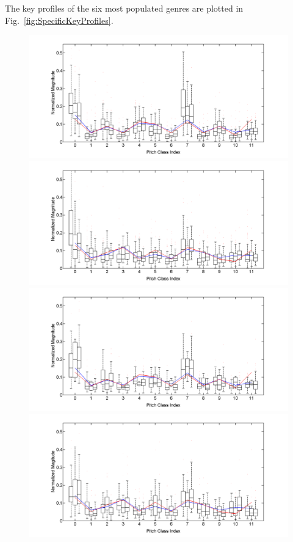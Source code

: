 \documentclass{article}
\begin{document}
The key profiles of the six most populated genres are plotted in Fig.~\ref{fig:SpecificKeyProfiles}.
\begin{figure}[tb]
\centering
    \includegraphics[scale=.2]{graph/boxPlotsMajCPR+Krum+Temp}
    \includegraphics[scale=.2]{graph/boxPlotsMinBHP+Krum+Temp}
    \includegraphics[scale=.2]{graph/boxPlotsMajDJRk+Krum+Temp}
    \includegraphics[scale=.2]{graph/boxPlotsMinDMR+Krum+Temp}

\end{figure}
\end{document}
